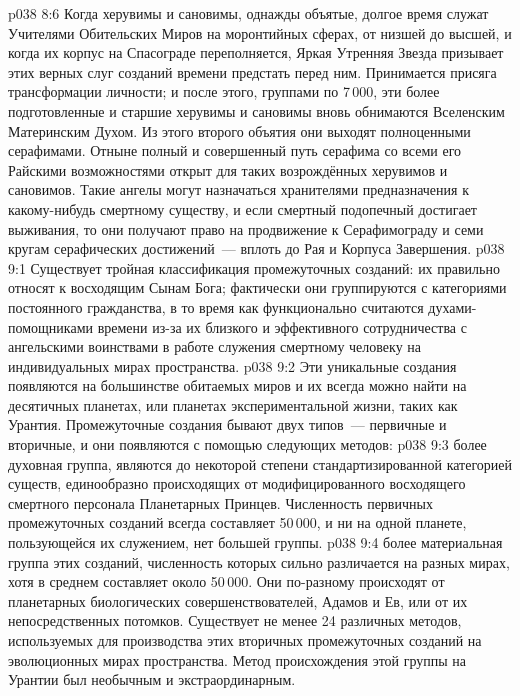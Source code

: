 \vs p038 8:6 Когда херувимы и сановимы, однажды объятые, долгое время служат Учителями Обительских Миров на моронтийных сферах, от низшей до высшей, и когда их корпус на Спасограде переполняется, Яркая Утренняя Звезда призывает этих верных слуг созданий времени предстать перед ним. Принимается присяга трансформации личности; и после этого, группами по 7\,000, эти более подготовленные и старшие херувимы и сановимы вновь обнимаются Вселенским Материнским Духом. Из этого второго объятия они выходят полноценными серафимами. Отныне полный и совершенный путь серафима со всеми его Райскими возможностями открыт для таких возрождённых херувимов и сановимов. Такие ангелы могут назначаться хранителями предназначения к какому\hyp{}нибудь смертному существу, и если смертный подопечный достигает выживания, то они получают право на продвижение к Серафимограду и семи кругам серафических достижений~--- вплоть до Рая и Корпуса Завершения.
\vs p038 9:1 Существует тройная классификация промежуточных созданий: их правильно относят к восходящим Сынам Бога; фактически они группируются с категориями постоянного гражданства, в то время как функционально считаются духами\hyp{}помощниками времени из-за их близкого и эффективного сотрудничества с ангельскими воинствами в работе служения смертному человеку на индивидуальных мирах пространства.
\vs p038 9:2 Эти уникальные создания появляются на большинстве обитаемых миров и их всегда можно найти на десятичных планетах, или планетах экспериментальной жизни, таких как Урантия. Промежуточные создания бывают двух типов~--- первичные и вторичные, и они появляются с помощью следующих методов:
\vs p038 9:3  более духовная группа, являются до некоторой степени стандартизированной категорией существ, единообразно происходящих от модифицированного восходящего смертного персонала Планетарных Принцев. Численность первичных промежуточных созданий всегда составляет 50\,000, и ни на одной планете, пользующейся их служением, нет большей группы.
\vs p038 9:4  более материальная группа этих созданий, численность которых сильно различается на разных мирах, хотя в среднем составляет около 50\,000. Они по\hyp{}разному происходят от планетарных биологических совершенствователей, Адамов и Ев, или от их непосредственных потомков. Существует не менее 24 различных методов, используемых для производства этих вторичных промежуточных созданий на эволюционных мирах пространства. Метод происхождения этой группы на Урантии был необычным и экстраординарным.
